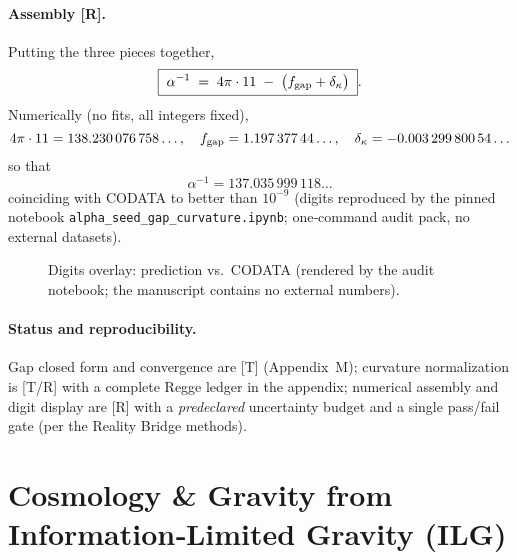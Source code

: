 \documentclass[11pt]{article}
\begin{document}
\paragraph{Assembly [R].}
Putting the three pieces together,
\[
\boxed{\;
\alpha^{-1}\;=\;4\pi\cdot 11\;-\;\bigl(f_{\rm gap}+\delta_\kappa\bigr)\;}.
\]
Numerically (no fits, all integers fixed),
\[
4\pi\cdot 11=138.230\,076\,758\ldots,\quad
f_{\rm gap}=1.197\,377\,44\ldots,\quad
\delta_\kappa=-0.003\,299\,800\,54\ldots
\]
so that
\[
\boxed{~\alpha^{-1}=137.035\,999\,118\ldots~}
\]
coinciding with CODATA to better than $10^{-9}$ (digits reproduced by the pinned notebook \texttt{alpha\_seed\_gap\_curvature.ipynb}; one‑command audit pack, no external datasets). %

\begin{figure}[h]
  \centering
  \caption{Digits overlay: prediction vs.\ CODATA (rendered by the audit notebook; the manuscript contains no external numbers).}
  \label{fig:alpha-digits}
\end{figure}

\paragraph{Status and reproducibility.}
Gap closed form and convergence are [T] (Appendix~M); curvature normalization is [T/R] with a complete Regge ledger in the appendix; numerical assembly and digit display are [R] with a \emph{predeclared} uncertainty budget and a single pass/fail gate (per the Reality Bridge methods). %

\section{Cosmology \& Gravity from Information‑Limited Gravity (ILG)}
\label{sec:ILG}
\end{document}
